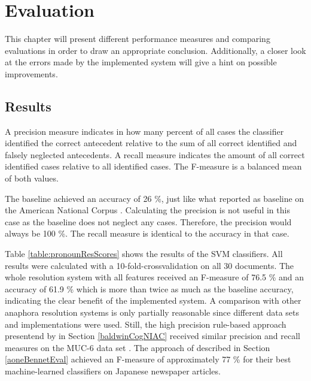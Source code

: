 \chapter{Evaluation}
\label{sec:Evaluation}

This chapter will present different performance measures and comparing evaluations in order to draw an appropriate conclusion. Additionally, a closer look at the errors made by the implemented system will give a hint on possible improvements.

\section{Results}
A precision measure indicates in how many percent of all cases the classifier identified the correct antecedent relative to the sum of all correct identified and falsely neglected antecedents. A recall measure indicates the amount of all correct identified cases relative to all identified cases. The F-measure is a balanced mean of both values.

The baseline achieved an accuracy of 26 \%, just like what \cite{bergsma2005automatic} reported as baseline on the American National Corpus \citep{ide2001american}. Calculating the precision is not useful in this case as the baseline does not neglect any cases. Therefore, the precision would always be 100 \%. The recall measure is identical to the accuracy in that case.

\begin{table}[h]
\centering
  \caption{Pronoun resolution performance scores}
     \label{table:pronounResScores}
\end{table}


Table \ref{table:pronounResScores} shows the results of the SVM classifiers. All results were calculated with a 10-fold-crossvalidation on all 30 documents. The whole resolution system with all features received an F-measure of 76.5 \% and an accuracy of 61.9 \% which is more than twice as much as the baseline accuracy, indicating the clear benefit of the implemented system. A comparison with other anaphora resolution systems is only partially reasonable since different data sets and implementations were used. Still, the high precision rule-based approach presentend by \cite{baldwin1997cogniac} in Section \ref{baldwinCogNIAC} received similar precision and recall measures on the MUC-6 data set \citep{grishman1996message}. The approach of \cite{aone1995evaluating} described in Section \ref{aoneBennetEval} achieved an F-measure of approximately 77 \% for their best machine-learned classifiers on Japanese newspaper articles.

